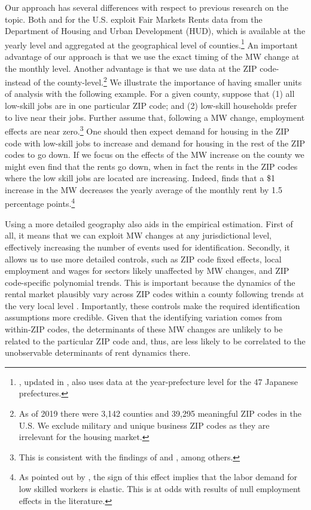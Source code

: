 Our approach has several differences with respect to previous research on the topic. Both 
\textcite{Tidemann2018} and \textcite{Yamagishi2019} for the U.S. exploit Fair Markets Rents data 
from the Department of Housing and Urban Development (HUD), which is available at the yearly 
level and aggregated at the geographical level of counties.\footnote{\textcite{Yamagishi2019}, 
	updated in \textcite{Yamagishi2020}, also uses data at the year-prefecture level for the 47 
	Japanese prefectures.}
An important advantage of our approach is that we use the exact timing of the MW change at 
the monthly level. 
Another advantage is that we use data at the ZIP code- instead of the county-level.\footnote{
	As of 2019 there were 3,142 counties and 39,295 meaningful ZIP codes in the U.S. We exclude 
	military and unique business ZIP codes as they are irrelevant for the housing market.} 
We illustrate the importance of having smaller units of analysis with the following example. 
For a given county, suppose that (1) all low-skill jobs are in one particular ZIP code; and 
(2) low-skill households prefer to live near their jobs. Further assume that, following a MW 
change, employment effects are near zero.\footnote{This is consistent with the findings of 
	\textcite{CardKrueger2000} and \textcite{CegnizEtAl2019}, among others.} 
One should then expect demand for housing in the ZIP code with low-skill jobs to increase and 
demand for housing in the rest of the ZIP codes to go down. If we focus on the effects of the 
MW increase on the county we might even find that the rents go down, when in fact the rents in 
the ZIP codes where the low skill jobs are located are increasing. Indeed, \textcite{Tidemann2018} 
finds that a \$1 increase in the MW decreases the yearly average of the monthly rent by 1.5 
percentage points.\footnote{As pointed out by \textcite{Tidemann2018}, the sign of this 
	effect 	implies that the labor demand for low skilled workers is elastic. This is at 
	odds with results of null employment effects in the literature.} 

Using a more detailed geography also aids in the empirical estimation. First of all, it means 
that we can exploit MW changes at any jurisdictional level, effectively increasing the number 
of events used for identification. Secondly, it allows us to use more detailed controls, such as 
ZIP code fixed effects, local employment and wages for sectors likely unaffected by MW changes, 
and ZIP code-specific polynomial trends. This is important because the dynamics of the rental 
market plausibly vary across ZIP codes within a county following trends at the very local level 
\parencite{AlmagroDominguez2019}. Importantly, these controls make the required identification 
assumptions more credible. Given that the identifying variation comes from within-ZIP codes, the 
determinants of these MW changes are unlikely to be related to the particular ZIP code and, thus, 
are less likely to be correlated to the unobservable determinants of rent dynamics there.

